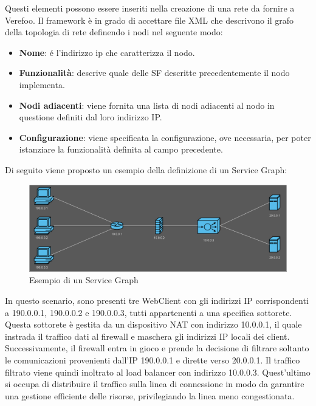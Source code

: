 Questi elementi possono essere inseriti nella creazione di una rete da fornire a Verefoo. Il framework è in grado di accettare file XML che descrivono il grafo della topologia di rete definendo i nodi nel seguente modo:

\begin{itemize}
    \item \textbf{Nome}: é l'indirizzo ip che caratterizza il nodo.
    \item \textbf{Funzionalità}: descrive quale delle SF descritte precedentemente il nodo implementa.
    \item \textbf{Nodi adiacenti}: viene fornita una lista di nodi adiacenti al nodo in questione definiti dal loro indirizzo IP. 
    \item  \textbf{Configurazione}: viene specificata la configurazione, ove necessaria, per poter istanziare la funzionalità definita al campo precedente.
\end{itemize}

Di seguito viene proposto un esempio della definizione di un Service Graph:

\begin{figure}[h]  %
    \centering
    \includegraphics[width=1\textwidth]{ServiceGraph.png}  %
    \caption{Esempio di un Service Graph}
    \label{fig:Service_Graph}
\end{figure}

In questo scenario, sono presenti tre WebClient con gli indirizzi IP corrispondenti a 190.0.0.1, 190.0.0.2 e 190.0.0.3, tutti appartenenti a una specifica sottorete. 
Questa sottorete è gestita da un dispositivo NAT con indirizzo 10.0.0.1, il quale instrada il traffico dati al firewall e maschera gli indirizzi IP locali dei client.
Successivamente, il firewall entra in gioco e prende la decisione di filtrare soltanto le comunicazioni provenienti dall'IP 190.0.0.1 e dirette verso 20.0.0.1. 
Il traffico filtrato viene quindi inoltrato al load balancer con indirizzo 10.0.0.3. 
Quest'ultimo si occupa di distribuire il traffico sulla linea di connessione in modo da garantire una gestione efficiente delle risorse, privilegiando la linea meno congestionata.\\



